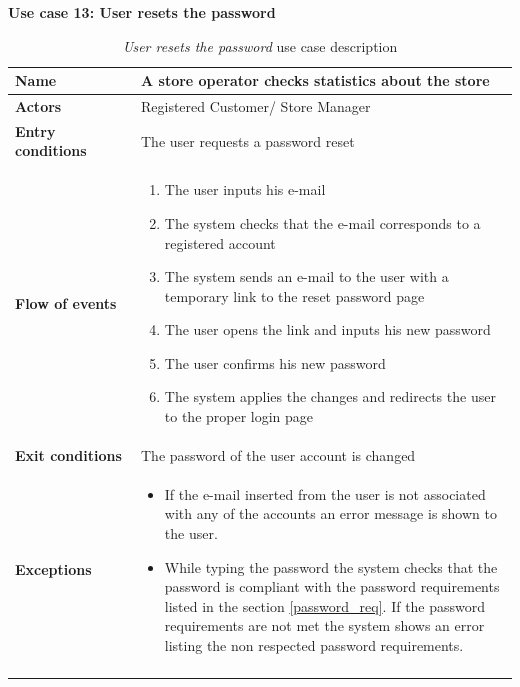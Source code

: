 \clearpage
\textbf{Use case 13: User resets the password}
\smallskip
{}
\begin{longtable}{p{0.25\linewidth}p{0.75\linewidth}}
    \toprule
    \textbf{Name}             & \textbf{A store operator checks statistics about the store} \\
    \midrule
    \textbf{Actors}           & Registered Customer/ Store Manager                          \\
    \midrule
    \textbf{Entry conditions} & The user  requests a password reset                         \\
    \midrule
    \textbf{Flow of events}   &
    \begin{enumerate}
        \item The user inputs his e-mail
        \item The system checks that the e-mail corresponds to a registered account
        \item The system sends an e-mail to the user with a temporary link to the reset password page
        \item The user opens the link and inputs his new password
        \item The user confirms his new password
        \item The system applies the changes and redirects the user to the proper login page
    \end{enumerate}                                                              \\
    \midrule
    \textbf{Exit conditions}  & The password of the user account is changed                 \\
    \midrule
    \textbf{Exceptions}       &
    \begin{itemize}
        \item If the e-mail inserted from the user is not associated with any of the accounts an error message is shown to the user.
        \item While typing the password the system checks that the password is compliant with the password requirements listed in the section \ref{password_req}. If the password requirements are not met the system shows an error listing the non respected password requirements.
    \end{itemize}                                                              \\
    \bottomrule
    \caption{\emph{User resets the password} use case description}
\end{longtable}
\clearpage

